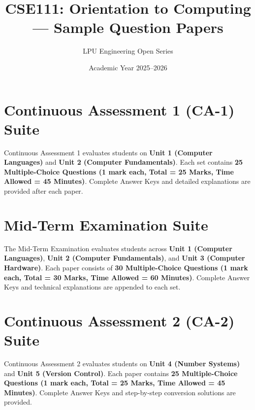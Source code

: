 \documentclass[a4paper,11pt,oneside,openany]{book}
\title{CSE111: Orientation to Computing --- Sample Question Papers}
\author{LPU Engineering Open Series}
\date{Academic Year 2025--2026}
\begin{document}
\frontmatter



\tableofcontents
\newpage

\mainmatter

\chapter{Continuous Assessment 1 (CA-1) Suite}
\label{chap:ca1_suite}
\noindent
Continuous Assessment 1 evaluates students on \textbf{Unit 1 (Computer Languages)} and \textbf{Unit 2 (Computer Fundamentals)}. Each set contains \textbf{25 Multiple-Choice Questions (1 mark each, Total = 25 Marks, Time Allowed = 45 Minutes)}. Complete Answer Keys and detailed explanations are provided after each paper.

\newpage





\chapter{Mid-Term Examination Suite}
\label{chap:midterm_suite}
\noindent
The Mid-Term Examination evaluates students across \textbf{Unit 1 (Computer Languages)}, \textbf{Unit 2 (Computer Fundamentals)}, and \textbf{Unit 3 (Computer Hardware)}. Each paper consists of \textbf{30 Multiple-Choice Questions (1 mark each, Total = 30 Marks, Time Allowed = 60 Minutes)}. Complete Answer Keys and technical explanations are appended to each set.

\newpage





\chapter{Continuous Assessment 2 (CA-2) Suite}
\label{chap:ca2_suite}
\noindent
Continuous Assessment 2 evaluates students on \textbf{Unit 4 (Number Systems)} and \textbf{Unit 5 (Version Control)}. Each paper contains \textbf{25 Multiple-Choice Questions (1 mark each, Total = 25 Marks, Time Allowed = 45 Minutes)}. Complete Answer Keys and step-by-step conversion solutions are provided.
\end{document}
